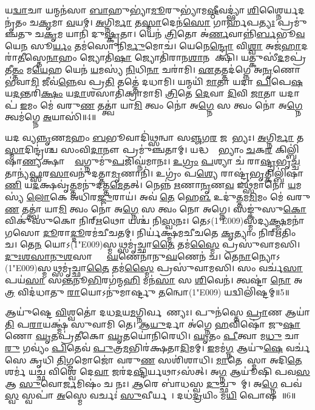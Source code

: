 𑌯\ul{𑌦𑍍𑌵𑌾}𑌚𑌾 𑌯𑌨𑍍𑌮𑌨॑𑌸𑌾 \ul{𑌬𑌾}𑌹𑍁𑌭𑍍𑌯𑌾॑\ul{𑌮𑍂}𑌰𑍁𑌭𑍍𑌯𑌾॑𑌮\ul{𑌷𑍍𑌠𑍀}𑌵𑌦𑍍𑌭𑍍𑌯𑌾॑ \ul{𑌶𑌿}𑌶𑍍𑌨𑍈𑌰𑍍𑌯𑌦𑌨𑍃॑𑌤𑌂 𑌚\ul{𑌕𑍃}𑌮𑌾 \ul{𑌵}𑌯𑌮𑍍। 
\ul{𑌅}𑌗𑍍𑌨𑌿\ul{𑌰𑍍𑌮𑌾} 𑌤\ul{𑌸𑍍𑌮𑌾}𑌦𑍇𑌨॑\ul{𑌸𑍋} 𑌗𑌾𑌰𑍍\mbox{}𑌹॑𑌪\ul{𑌤𑍍𑌯𑌃} 𑌪𑍍𑌰𑌮𑍁॑𑌞𑍍𑌚𑌤𑍁 𑌚\ul{𑌕𑍃}𑌮 𑌯𑌾𑌨𑌿॑ 𑌦𑍁\ul{𑌷𑍍𑌕𑍃}𑌤𑌾। 
𑌯𑍇𑌨॑ \ul{𑌤𑍍𑌰𑌿}𑌤𑍋 𑌅॑\ul{𑌰𑍍𑌣}𑌵𑌾𑌨𑍍𑌨𑌿॑\ul{𑌰𑍍𑌬}𑌭𑍂\ul{𑌵} 𑌯𑍇\ul{𑌨} 𑌸𑍂\ul{𑌰𑍍𑌯𑌂} 𑌤𑌮॑𑌸𑍋 𑌨𑌿\ul{𑌰𑍍𑌮𑍁}𑌮𑍋𑌚॑। 
𑌯𑍇𑌨𑍇\ul{𑌨𑍍𑌦𑍍𑌰𑍋} 𑌵𑌿\ul{𑌶𑍍𑌵𑌾} 𑌅𑌜॑\ul{𑌹𑌾}𑌦𑌰𑌾॑\ul{𑌤𑍀}𑌸𑍍𑌤𑍇\ul{𑌨𑌾}𑌹𑌂 𑌜𑍍𑌯𑍋𑌤𑌿॑\ul{𑌷𑌾} 𑌜𑍍𑌯𑍋𑌤𑌿॑𑌰𑌾𑌨\ul{𑌶𑌾}𑌨 𑌆᳚𑌕𑍍𑌷𑌿। 
𑌯𑌤𑍍𑌕𑍁𑌸𑍀॑\ul{𑌦}𑌮𑌪𑍍𑌰॑𑌤𑍀\ul{𑌤𑍍𑌤𑌂} 𑌮\ul{𑌯𑍇}𑌹 𑌯𑍇𑌨॑ \ul{𑌯}𑌮𑌸𑍍𑌯॑ \ul{𑌨𑌿}𑌧𑌿\ul{𑌨𑌾} 𑌚𑌰𑌾॑𑌮𑌿। 
\ul{𑌏}𑌤𑌤𑍍𑌤𑌦॑𑌗𑍍𑌨𑍇 𑌅\ul{𑌨𑍃}𑌣𑍋 𑌭॑𑌵𑌾\ul{𑌮𑌿} 𑌜𑍀𑌵॑\ul{𑌨𑍍𑌨𑍇}𑌵 𑌪𑍍𑌰\ul{𑌤𑌿} 𑌤𑌤𑍍𑌤𑍇॑ 𑌦𑌧𑌾𑌮𑌿। 
𑌯𑌨𑍍𑌮𑌯𑌿॑ \ul{𑌮𑌾}𑌤𑌾 𑌯𑌦𑌾॑ \ul{𑌪𑌿}𑌪𑍇\ul{𑌷} 𑌯\ul{𑌦}𑌨𑍍𑌤𑌰𑌿॑\ul{𑌕𑍍𑌷𑌂} 𑌯\ul{𑌦𑌾}𑌶𑌸𑌾𑌤𑌿॑𑌕𑍍𑌰𑌾𑌮𑌾𑌮𑌿 \ul{𑌤𑍍𑌰𑌿}𑌤𑍇 \ul{𑌦𑍇}𑌵𑌾 \ul{𑌦𑌿}𑌵𑌿 \ul{𑌜𑌾}𑌤𑌾 𑌯𑌦𑌾𑌪॑ \ul{𑌇}𑌮𑌂 𑌮𑍇॑ 𑌵𑌰𑍁\ul{𑌣} 𑌤𑌤𑍍𑌤𑍍𑌵𑌾॑ 𑌯𑌾\ul{𑌮𑌿} 𑌤𑍍𑌵𑌂 𑌨𑍋॑ 𑌅\ul{𑌗𑍍𑌨𑍇} 𑌸 𑌤𑍍𑌵𑌂 𑌨𑍋॑ 𑌅\ul{𑌗𑍍𑌨𑍇} 𑌤𑍍𑌵𑌮॑𑌗𑍍𑌨𑍇 \ul{𑌅}𑌯𑌾𑌸𑌿॑॥4॥\anuvakamend

𑌯𑌦𑌦𑍀᳚𑌵𑍍𑌯\ul{𑌨𑍍𑌨𑍃}𑌣\ul{𑌮}𑌹𑌂 \ul{𑌬}𑌭𑍂𑌵𑌾𑌦𑌿॑𑌥𑍍𑌸𑌨𑍍𑌵𑌾 𑌸\ul{𑌞𑍍𑌜}𑌗\ul{𑌰} 𑌜𑌨𑍇᳚𑌭𑍍𑌯𑌃। 
\ul{𑌅}𑌗𑍍𑌨𑌿\ul{𑌰𑍍𑌮𑌾} 𑌤\ul{𑌸𑍍𑌮𑌾}𑌦𑌿𑌨𑍍𑌦𑍍𑌰॑𑌶𑍍𑌚 𑌸𑌂𑌵𑌿\ul{𑌦𑌾}𑌨𑍗 𑌪𑍍𑌰𑌮𑍁॑𑌞𑍍𑌚𑌤𑌾𑌮𑍍। 
𑌯𑌦𑍍𑌧𑌸𑍍𑌤𑌾᳚𑌭𑍍𑌯𑌾𑌂 \ul{𑌚}𑌕\ul{𑌰} 𑌕𑌿𑌲𑍍𑌬𑌿॑𑌷𑌾\ul{𑌣𑍍𑌯}𑌕𑍍𑌷𑌾𑌣𑌾𑌂᳚ \ul{𑌵}𑌗𑍍𑌨𑍁𑌮𑍁॑\ul{𑌪}𑌜𑌿𑌘𑍍𑌨॑𑌮𑌾𑌨𑌃। 
\ul{𑌉}\ul{𑌗𑍍𑌰𑌂} \ul{𑌪}𑌶𑍍𑌯𑌾 𑌚॑ 𑌰𑌾\ul{𑌷𑍍𑌟𑍍𑌰}𑌭𑍃\ul{𑌚𑍍𑌚} 𑌤𑌾𑌨𑍍𑌯॑\ul{𑌫𑍍𑌸}𑌰\ul{𑌸𑌾}𑌵𑌨𑍁॑𑌦𑌤𑍍𑌤𑌾\ul{𑌮𑍃}𑌣𑌾𑌨𑌿॑। 
𑌉𑌗𑍍𑌰𑌂॑ 𑌪\ul{𑌶𑍍𑌯𑍇} 𑌰𑌾𑌷𑍍𑌟𑍍𑌰॑\ul{𑌭𑍃}𑌤𑍍𑌕𑌿𑌲𑍍𑌬𑌿॑𑌷𑌾\ul{𑌣𑌿} 𑌯\ul{𑌦}𑌕𑍍𑌷𑌵𑍃॑\ul{𑌤𑍍𑌤}𑌮𑌨𑍁॑𑌦𑌤𑍍𑌤\ul{𑌮𑍇}𑌤𑌤𑍍। 
𑌨𑍇𑌨𑍍𑌨॑ \ul{𑌋}𑌣𑌾\ul{𑌨𑍃}𑌣\ul{𑌵} 𑌇𑌥𑍍𑌸॑𑌮𑌾𑌨𑍋 \ul{𑌯}𑌮𑌸𑍍𑌯॑ \ul{𑌲𑍋}𑌕𑍇 𑌅𑌧𑌿॑𑌰\ul{𑌜𑍍𑌜𑍁}𑌰𑌾𑌯॑। 
𑌅𑌵॑ \ul{𑌤𑍇} 𑌹𑍇\ul{𑌳} 𑌉𑌦𑍁॑\ul{𑌤𑍍𑌤}𑌮\ul{𑌮𑌿}𑌮𑌂 𑌮𑍇॑ 𑌵𑌰𑍁\ul{𑌣} 𑌤𑌤𑍍𑌤𑍍𑌵𑌾॑ 𑌯𑌾\ul{𑌮𑌿} 𑌤𑍍𑌵𑌂 𑌨𑍋॑ 𑌅\ul{𑌗𑍍𑌨𑍇} 𑌸 𑌤𑍍𑌵𑌂 𑌨𑍋 𑌅𑌗𑍍𑌨𑍇। 
𑌸𑌙𑍍𑌕𑍁॑𑌸𑍁\ul{𑌕𑍋} 𑌵𑌿𑌕𑍁॑𑌸𑍁𑌕𑍋 𑌨𑌿𑌰𑍍\mbox{}\ul{𑌋}𑌥𑍋 𑌯𑌶𑍍𑌚॑ 𑌨𑌿\ul{𑌸𑍍𑌵}𑌨𑌃। 
𑌤𑍇𑌽(1\char"E009)𑌸𑍍𑌮𑌦𑍍𑌯\ul{𑌕𑍍𑌷𑍍𑌮}𑌮𑌨𑌾॑𑌗𑌸𑍋 \ul{𑌦𑍂}𑌰𑌾\ul{𑌦𑍍𑌦𑍂}𑌰𑌮॑𑌚𑍀𑌚𑌤𑌮𑍍। 
𑌨𑌿𑌰𑍍𑌯॑𑌕𑍍𑌷𑍍𑌮𑌮𑌚𑍀𑌚𑌤𑍇 \ul{𑌕𑍃}𑌤𑍍𑌯𑌾𑌂 𑌨𑌿𑌰𑍍\mbox{}𑌋॑𑌤𑌿𑌂 𑌚। 
𑌤𑍇\ul{𑌨} 𑌯𑍋𑌽(1\char"E009)𑌸𑍍𑌮𑌥𑍍𑌸𑌮𑍃॑𑌚𑍍𑌛𑌾\ul{𑌤𑍈} 𑌤𑌮॑\ul{𑌸𑍍𑌮𑍈} 𑌪𑍍𑌰𑌸𑍁॑𑌵𑌾𑌮𑌸𑌿। 
\ul{𑌦𑍁𑌃}\ul{𑌶}\ul{}\ul{𑌸𑌾}\ul{𑌨𑍁}\ul{𑌶}\ul{}𑌸𑌾𑌭𑍍𑌯𑌾𑌂᳚ \ul{𑌘}𑌣𑍇𑌨𑌾॑𑌨𑍁\ul{𑌘}𑌣𑍇𑌨॑ 𑌚। 
𑌤𑍇\ul{𑌨𑌾}𑌨𑍍𑌯𑍋𑌽(1\char"E009)𑌸𑍍𑌮𑌥𑍍𑌸𑌮𑍃॑𑌚𑍍𑌛𑌾\ul{𑌤𑍈} 𑌤𑌮॑\ul{𑌸𑍍𑌮𑍈} 𑌪𑍍𑌰𑌸𑍁॑𑌵𑌾𑌮𑌸𑌿। 
𑌸𑌂 𑌵𑌰𑍍𑌚॑\ul{𑌸𑌾} 𑌪𑌯॑\ul{𑌸𑌾} 𑌸\ul{𑌨𑍍𑌤}𑌨𑍂\ul{𑌭𑌿}𑌰𑌗॑𑌨𑍍𑌮\ul{𑌹𑌿} 𑌮𑌨॑\ul{𑌸𑌾} 𑌸 \ul{𑌶𑌿}𑌵𑍇𑌨॑। 
𑌤𑍍𑌵𑌷𑍍𑌟𑌾॑ \ul{𑌨𑍋} 𑌅\ul{𑌤𑍍𑌰} 𑌵𑌿𑌦॑𑌧𑌾𑌤𑍁 \ul{𑌰𑌾}𑌯𑍋𑌽𑌨𑍁॑𑌮𑌾𑌰𑍍𑌷𑍍𑌟𑍁 \ul{𑌤}𑌨𑍍𑌵𑍋(1\char"E009) 𑌯𑌦𑍍𑌵𑌿𑌲𑌿॑𑌷𑍍𑌟𑌮𑍍॥5॥\anuvakamend


𑌆𑌯𑍁॑𑌷𑍍𑌟𑍇 \ul{𑌵𑌿}𑌶𑍍𑌵𑌤𑍋॑ 𑌦𑌧\ul{𑌦}𑌯\ul{𑌮}𑌗𑍍𑌨𑌿𑌰𑍍𑌵𑌰𑍇᳚𑌣𑍍𑌯𑌃। 
𑌪𑍁𑌨॑𑌸𑍍𑌤𑍇 \ul{𑌪𑍍𑌰𑌾}𑌣 𑌆𑌯𑌾॑\ul{𑌤𑌿} 𑌪\ul{𑌰𑌾}𑌯𑌕𑍍𑌷𑍍𑌮॑ 𑌸𑍁𑌵𑌾𑌮𑌿 𑌤𑍇। 
\ul{𑌆}\ul{𑌯𑍁}𑌰𑍍𑌦𑌾 𑌅॑𑌗𑍍𑌨𑍇 \ul{𑌹}𑌵𑌿𑌷𑍋॑ 𑌜𑍁\ul{𑌷𑌾}𑌣𑍋 \ul{𑌘𑍃}𑌤𑌪𑍍𑌰॑𑌤𑍀𑌕𑍋 \ul{𑌘𑍃}𑌤𑌯𑍋॑𑌨𑌿𑌰𑍇𑌧𑌿। 
\ul{𑌘𑍃}𑌤𑌂 \ul{𑌪𑍀}𑌤𑍍𑌵𑌾 𑌮\ul{𑌧𑍁} 𑌚𑌾\ul{𑌰𑍁} 𑌗𑌵𑍍𑌯𑌂॑ \ul{𑌪𑌿}𑌤𑍇𑌵॑ \ul{𑌪𑍁}𑌤𑍍𑌰\ul{𑌮}𑌭𑌿𑌰॑𑌕𑍍𑌷𑌤𑌾\ul{𑌦𑌿}𑌮𑌮𑍍। 
\ul{𑌇}𑌮𑌮॑\ul{𑌗𑍍𑌨} 𑌆𑌯𑍁॑\ul{𑌷𑍇} 𑌵𑌰𑍍𑌚॑𑌸𑍇 𑌕𑍃𑌧𑌿 \ul{𑌤𑌿}𑌗𑍍𑌮𑌮𑍋𑌜𑍋॑ 𑌵𑌰𑍁\ul{𑌣} 𑌸𑌶𑌿॑𑌶𑌾𑌧𑌿। 
\ul{𑌮𑌾}𑌤𑍇𑌵𑌾᳚𑌸𑍍𑌮𑌾 𑌅𑌦𑌿\ul{𑌤𑍇} 𑌶𑌰𑍍𑌮॑ 𑌯\ul{𑌚𑍍𑌛} 𑌵𑌿𑌶𑍍𑌵𑍇॑ 𑌦𑍇\ul{𑌵𑌾} 𑌜𑌰॑𑌦\ul{𑌷𑍍𑌟𑌿}𑌰𑍍𑌯𑌥𑌾𑌽𑌸॑𑌤𑍍। 
𑌅\ul{𑌗𑍍𑌨} 𑌆𑌯𑍂॑𑌷𑌿 𑌪𑌵\ul{𑌸} 𑌆 \ul{𑌸𑍁}𑌵𑍋\ul{𑌰𑍍𑌜}𑌮𑌿𑌷𑌂॑ 𑌚 𑌨𑌃। 
\ul{𑌆}𑌰𑍇 𑌬𑌾॑𑌧𑌸𑍍𑌵 \ul{𑌦𑍁}𑌚𑍍𑌛𑍁𑌨𑌾᳚𑌮𑍍। 
𑌅\ul{𑌗𑍍𑌨𑍇} 𑌪𑌵॑\ul{𑌸𑍍𑌵} 𑌸𑍍𑌵𑌪𑌾॑ \ul{𑌅}𑌸𑍍𑌮𑍇 𑌵𑌰𑍍𑌚𑌃॑ \ul{𑌸𑍁}𑌵𑍀𑌰𑍍𑌯𑌮𑍍᳚। 
𑌦𑌧॑\ul{𑌦𑍍𑌰}𑌯𑌿𑌂 𑌮\ul{𑌯𑌿} 𑌪𑍋𑌷𑌮𑍍᳚॥6॥

